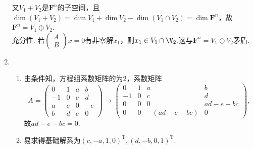 \begin{enumerate}
        又$V_1+V_2$是$\mathbf{F}^n$的子空间，且$\dim(V_1+V_2)=\dim V_1+\dim V_2-\dim(V_1\cap V_2)=\dim\mathbf{F}^n$，故$\mathbf{F}^n=V_1\oplus V_2$.\\
        充分性. 若$\begin{pmatrix}A\\B\end{pmatrix}x=0$有非零解$x_1$，则$x_1\in V_1\cap\V_2.$这与$\mathbf{F}^n=V_1\oplus V_2$矛盾.
    \item
        \begin{enumerate}
            \item
                由条件知，方程组系数矩阵的为$2$，系数矩阵
                \begin{equation*}
                    A=\begin{pmatrix}
                        0 & 1 & a & b \\
                        -1 & 0 & c & d \\
                        a & c & 0 & -e \\
                        b & d & e & 0
                    \end{pmatrix}\rightarrow
                    \begin{pmatrix}
                        0 & 1 & a & b \\
                        -1 & 0 & c & d \\
                        0 & 0 & 0 & ad-e-bc \\
                        0 & 0 & -(ad-e-bc) & 0
                    \end{pmatrix},
                \end{equation*}
                故$ad-e-bc=0$.
            \item 易求得基础解系为$(c,-a,1,0)^\mathrm{T},(d,-b,0,1)^\mathrm{T}$.
        \end{enumerate}
\end{enumerate}

